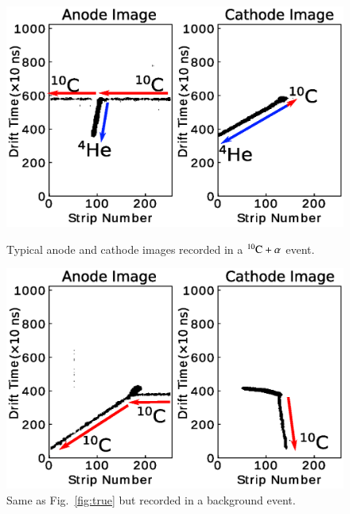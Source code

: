 \documentclass{jps-cp}
\begin{document}
\begin{figure}
  \centering
  \begin{minipage}{0.45\columnwidth}
    \centering
    \includegraphics[clip, width=0.9\columnwidth]{eps/true.eps}
    \caption{Typical anode and cathode images recorded in a ${}^{10}\rm{C}+\alpha$ event.}
    \label{fig:true}
  \end{minipage}
  \hfill
  \begin{minipage}{0.45\columnwidth}
    \centering
    \includegraphics[clip, width=0.9\columnwidth]{eps/false.eps}
    \caption{Same as Fig.~\ref{fig:true} but recorded in a background event.}
    \label{fig:false}
  \end{minipage}
\end{figure}
\end{document}
